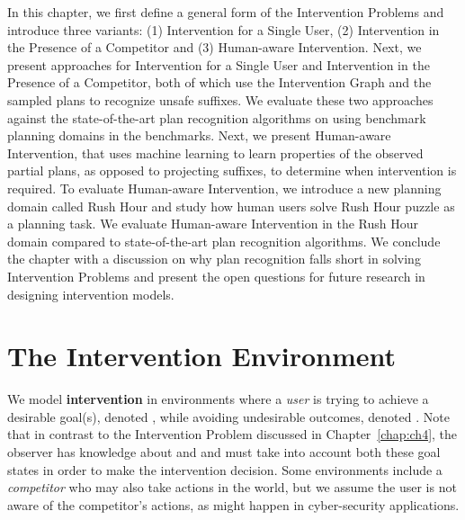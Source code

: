 In this chapter, we first define a general form of the Intervention Problems and introduce three variants: (1) Intervention for a Single User, (2) Intervention in the Presence of a Competitor and (3) Human-aware Intervention. Next, we present approaches for Intervention for a Single User and Intervention in the Presence of a Competitor, both of which use the Intervention Graph and the sampled plans to recognize unsafe suffixes. We evaluate these two approaches against the state-of-the-art plan recognition algorithms on using benchmark planning domains in the benchmarks. Next, we present Human-aware Intervention, that uses machine learning to learn properties of the observed partial plans, as opposed to projecting suffixes, to determine when intervention is required. To evaluate Human-aware Intervention, we introduce a new planning domain called Rush Hour and study how human users solve Rush Hour puzzle as a planning task. We evaluate Human-aware Intervention in the Rush Hour domain compared to state-of-the-art plan recognition algorithms. We conclude the chapter with a discussion on why plan recognition falls short in solving Intervention Problems and present the open questions for future research in designing intervention models.


\section{The Intervention Environment}
\label{sec:distinguishing}
We model {\bf intervention} in environments where a \textit{user} is trying to achieve a desirable goal(s), denoted \desired, while avoiding undesirable outcomes, denoted \undesired.
Note that in contrast to the Intervention Problem discussed in Chapter~\ref{chap:ch4}, the observer has knowledge about \desired and \undesired and must take into account both these goal states in order to make the intervention decision.
Some environments include a \textit{competitor} who may also take actions in the world, but we assume the user is not aware of the competitor's actions, as might happen in cyber-security applications.


